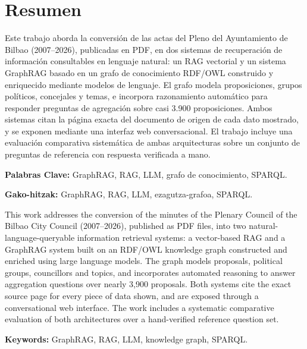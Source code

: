 \chapter*{Resumen }

Este trabajo aborda la conversión de las actas del Pleno del Ayuntamiento de
Bilbao (2007--2026), publicadas en PDF, en dos sistemas de recuperación de
información consultables en lenguaje natural: un RAG vectorial y un sistema
GraphRAG basado en un grafo de conocimiento RDF/OWL construido y enriquecido
mediante modelos de lenguaje. El grafo modela proposiciones, grupos políticos,
concejales y temas, e incorpora razonamiento automático para responder preguntas
de agregación sobre casi 3.900 proposiciones. Ambos sistemas citan la página
exacta del documento de origen de cada dato mostrado, y se exponen mediante una
interfaz web conversacional. El trabajo incluye una evaluación comparativa
sistemática de ambas arquitecturas sobre un conjunto de preguntas de referencia
con respuesta verificada a mano.

\textbf{Palabras Clave:} GraphRAG, RAG, LLM, grafo de conocimiento, SPARQL.


\textcolor{eus-color}{{}}

\textcolor{eus-color}{{\serif \textbf{Gako-hitzak:}} GraphRAG, RAG, LLM, ezagutza-grafoa, SPARQL.}


\textcolor{eng-color}{This work addresses the conversion of the minutes of the Plenary Council of the Bilbao City Council (2007--2026), published as PDF files, into two natural-language-queryable information retrieval systems: a vector-based RAG and a GraphRAG system built on an RDF/OWL knowledge graph constructed and enriched using large language models. The graph models proposals, political groups, councillors and topics, and incorporates automated reasoning to answer aggregation questions over nearly 3,900 proposals. Both systems cite the exact source page for every piece of data shown, and are exposed through a conversational web interface. The work includes a systematic comparative evaluation of both architectures over a hand-verified reference question set.}

\textcolor{eng-color}{\textbf{Keywords:} GraphRAG, RAG, LLM, knowledge graph, SPARQL.}
